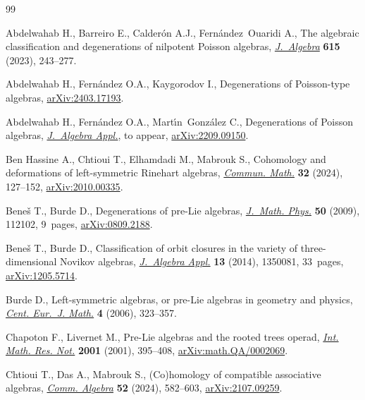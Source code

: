 \begin{thebibliography}{99}
\footnotesize\itemsep=0pt

Abdelwahab H., Barreiro E., Calder\'on A.J., Fern\'andez~Ouaridi A., The
 algebraic classification and degenerations of nilpotent {P}oisson algebras,
 \href{https://doi.org/10.1016/j.jalgebra.2022.10.018}{\textit{J.~Algebra}} \textbf{615} (2023), 243--277.

Abdelwahab H., Fern\'andez O.A., Kaygorodov I., Degenerations of {P}oisson-type
 algebras, \href{https://arxiv.org/abs/2403.17193}{arXiv:2403.17193}.

Abdelwahab H., Fern\'andez O.A., Mart\'{\i}n~Gonz\'alez C., Degenerations of
 {P}oisson algebras, \href{https://doi.org/10.1142/S0219498825500872}{\textit{J.~Algebra Appl.}}, {t}o appear,
 \href{https://arxiv.org/abs/2209.09150}{arXiv:2209.09150}.

Ben Hassine A., Chtioui T., Elhamdadi M., Mabrouk S., Cohomology and
 deformations of left-symmetric {R}inehart algebras, \href{https://doi.org/10.46298/cm.12656}{\textit{Commun. Math.}}
 \textbf{32} (2024), 127--152, \href{https://arxiv.org/abs/2010.00335}{arXiv:2010.00335}.


Bene\v{s} T., Burde D., Degenerations of pre-{L}ie algebras, \href{https://doi.org/10.1063/1.3246608}{\textit{J.~Math.
 Phys.}} \textbf{50} (2009), 112102, 9~pages, \href{https://arxiv.org/abs/0809.2188}{arXiv:0809.2188}.

Bene\v{s} T., Burde D., Classification of orbit closures in the variety of
 three-dimensional {N}ovikov algebras, \href{https://doi.org/10.1142/S0219498813500813}{\textit{J.~Algebra Appl.}} \textbf{13}
 (2014), 1350081, 33~pages, \href{https://arxiv.org/abs/1205.5714}{arXiv:1205.5714}.

Burde D., Left-symmetric algebras, or pre-{L}ie algebras in geometry and
 physics, \href{https://doi.org/10.2478/s11533-006-0014-9}{\textit{Cent. Eur.~J. Math.}} \textbf{4} (2006), 323--357.

Chapoton F., Livernet M., Pre-{L}ie algebras and the rooted trees operad,
 \href{https://doi.org/10.1155/S1073792801000198}{\textit{Int. Math. Res. Not.}} \textbf{2001} (2001), 395--408,
 \href{https://arxiv.org/abs/math.QA/0002069}{arXiv:math.QA/0002069}.

Chtioui T., Das A., Mabrouk S., ({C}o)homology of compatible associative
 algebras, \href{https://doi.org/10.1080/00927872.2023.2245915}{\textit{Comm. Algebra}} \textbf{52} (2024), 582--603,
 \href{https://arxiv.org/abs/2107.09259}{arXiv:2107.09259}.


\end{thebibliography}
